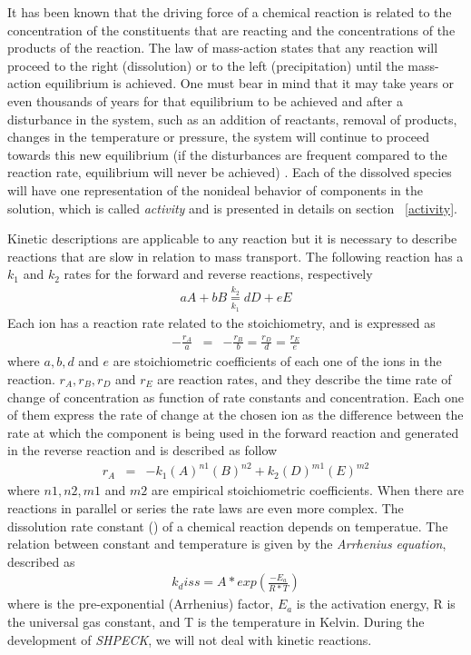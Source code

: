 It has been known that the driving force of a chemical reaction is related to the concentration of the constituents that are reacting and the concentrations of the products of the reaction. The law of mass-action states that any reaction will proceed to the right (dissolution) or to the left (precipitation) until the mass-action equilibrium is achieved. One must bear in mind that it may take years or even thousands of years for that equilibrium to be achieved and after a disturbance in the system, such as an addition of reactants, removal of products, changes in the temperature or pressure, the system will continue to proceed towards this new equilibrium (if the disturbances are frequent compared to the reaction rate, equilibrium will never be achieved) \cite{Freeze:79}. Each of the dissolved species will have one representation of the nonideal behavior of components in the solution, which is called \emph{activity} and is presented in details on section ~\ref{activity}.

Kinetic descriptions are applicable to any reaction but it is necessary to describe  reactions that are slow in relation to mass transport.  The following reaction has a $k_1$ and $k_2$ rates for the forward and reverse reactions, respectively 
\begin{eqnarray}
aA + bB \underset{k_1}{\overset{k_2}{=}} dD + eE 
\end{eqnarray}
Each ion has a reaction rate related to the stoichiometry, and is expressed as
\begin{eqnarray}
-\frac{r_A}{a} &=& -\frac{r_B}{b} = \frac{r_D}{d} = \frac{r_E}{e}
\end{eqnarray}
where $a, b, d$ and $e$ are stoichiometric coefficients of each one of the ions in the reaction. $r_A, r_B, r_D$ and $r_E$ are reaction rates, and they describe the time rate of change of concentration as function of rate constants and concentration. Each one of them express the rate of change at the chosen ion as the difference between the rate at which the component is being used in the forward reaction and generated in the reverse reaction and is described as follow
\begin{eqnarray}
r_A &=& - k_1 (A)^{n1}(B)^{n2} + k_2 (D)^{m1}(E)^{m2}
\end{eqnarray}
where $n1, n2, m1$ and $m2$ are empirical stoichiometric coefficients. When there are reactions in parallel or series the rate laws are even more complex.
The dissolution rate constant () of a chemical reaction depends on temperatue. The relation between constant and temperature is given by the \emph{Arrhenius equation}, described as
\begin{eqnarray}
k_diss = A * exp(\frac{-E_a}{R*T})
\end{eqnarray}
where  is the pre-exponential (Arrhenius) factor, $E_a$ is the activation energy, R is the universal gas constant, and T is the temperature in Kelvin.
During the development of \emph{SHPECK}, we will not deal with kinetic reactions.

